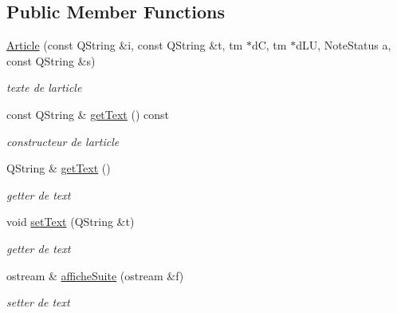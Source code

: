 \subsection*{Public Member Functions}
\begin{DoxyCompactItemize}
\item 
\mbox{\label{classArticle_aa35841d6c1af4c57dd607ab6537038dc}} 
\hyperlink{classArticle_aa35841d6c1af4c57dd607ab6537038dc}{Article} (const Q\+String \&i, const Q\+String \&t, tm $\ast$dC, tm $\ast$d\+LU, Note\+Status a, const Q\+String \&s)
\begin{DoxyCompactList}\small\item\em texte de l\textquotesingle{}article \end{DoxyCompactList}\item 
\mbox{\label{classArticle_a235fb07dfa8507b171c35624ada564d7}} 
const Q\+String \& \hyperlink{classArticle_a235fb07dfa8507b171c35624ada564d7}{get\+Text} () const
\begin{DoxyCompactList}\small\item\em constructeur de l\textquotesingle{}article \end{DoxyCompactList}\item 
\mbox{\label{classArticle_a172524cad2a3497e041ff4e562dfd587}} 
Q\+String \& \hyperlink{classArticle_a172524cad2a3497e041ff4e562dfd587}{get\+Text} ()
\begin{DoxyCompactList}\small\item\em getter de text \end{DoxyCompactList}\item 
\mbox{\label{classArticle_ab9c6639a56ea4c979dbac4153595937a}} 
void \hyperlink{classArticle_ab9c6639a56ea4c979dbac4153595937a}{set\+Text} (Q\+String \&t)
\begin{DoxyCompactList}\small\item\em getter de text \end{DoxyCompactList}\item 
ostream \& \hyperlink{classArticle_a63e4e505cdfb8b11a9504ba4e3ba3c29}{affiche\+Suite} (ostream \&f)
\begin{DoxyCompactList}\small\item\em setter de text \end{DoxyCompactList}\item 

\end{DoxyCompactItemize}
